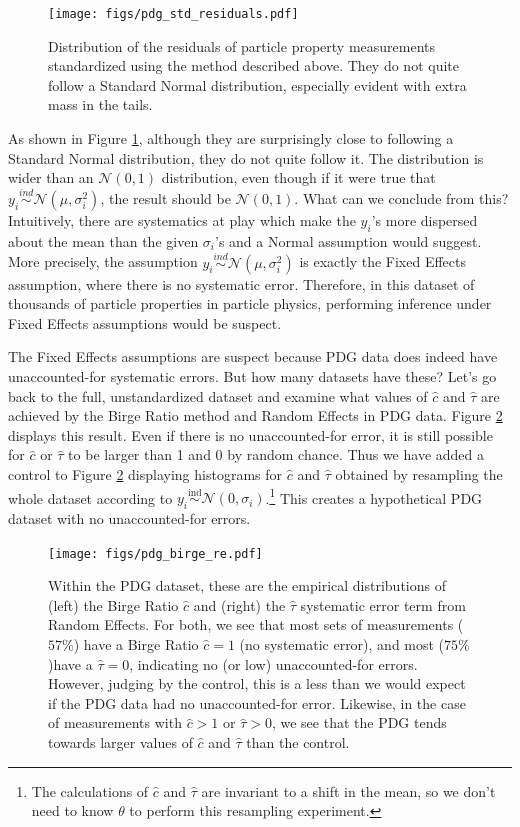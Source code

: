 \documentclass[12pt]{article}
\begin{document}
\begin{figure}[H]
\centering
\texttt{[image: figs/pdg\_std\_residuals.pdf]}
\caption{Distribution of the residuals of particle property measurements standardized using the method described above. They do not quite follow a Standard Normal distribution, especially evident with extra mass in the tails.}
\label{fig:pdg-std-residuals}
\end{figure}

As shown in Figure \ref{fig:pdg-std-residuals}, although they are surprisingly close to following a Standard Normal distribution, they do not quite follow it. The distribution is wider than an $\mathcal{N}(0,1)$ distribution, even though if it were true that $y_i\overset{ind}{\sim} \mathcal{N}(\mu,\sigma_i^2)$, the result should be $\mathcal{N}(0,1)$. What can we conclude from this? Intuitively, there are systematics at play which make the $y_i$'s more dispersed about the mean than the given $\sigma_i$'s and a Normal assumption would suggest. More precisely, the assumption $y_i\overset{ind}{\sim} \mathcal{N}(\mu,\sigma_i^2)$ is exactly the Fixed Effects assumption, where there is no systematic error. Therefore, in this dataset of thousands of particle properties in particle physics, performing inference under Fixed Effects assumptions would be suspect.

The Fixed Effects assumptions are suspect because PDG data does indeed have unaccounted-for systematic errors. But how many datasets have these? Let's go back to the full, unstandardized dataset and examine what values of $\hat c$ and $\hat \tau$ are achieved by the Birge Ratio method and Random Effects in PDG data. Figure \ref{fig:pdg-birge-re} displays this result. Even if there is no unaccounted-for error, it is still possible for $\hat c$ or $\hat \tau$ to be larger than 1 and 0 by random chance. Thus we have added a control to Figure \ref{fig:pdg-birge-re} displaying histograms for $\hat c$ and $\hat \tau$ obtained by resampling the whole dataset according to $y_i\overset{\mathrm{ind}}{\sim}\mathcal{N}(0, \sigma_i)$.\footnote{The calculations of $\hat c$ and $\hat \tau$ are invariant to a shift in the mean, so we don't need to know $\theta$ to perform this resampling experiment.} This creates a hypothetical PDG dataset with no unaccounted-for errors.

\begin{figure}[H]
\centering
\texttt{[image: figs/pdg\_birge\_re.pdf]}
\caption{Within the PDG dataset, these are the empirical distributions of (left) the Birge Ratio $\hat c$ and (right) the $\hat\tau$ systematic error term from Random Effects. For both, we see that most sets of measurements ($57\%$) have a Birge Ratio $\hat c=1$ (no systematic error), and most ($75\%$)have a $\hat\tau=0$, indicating no (or low) unaccounted-for errors. However, judging by the control, this is a less than we would expect if the PDG data had no unaccounted-for error. Likewise, in the case of measurements with $\hat c>1$ or $\hat\tau>0$, we see that the PDG tends towards larger values of $\hat c$ and $\hat\tau$ than the control.
}
\label{fig:pdg-birge-re}
\end{figure}
\end{document}
